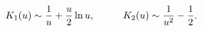 \begin{equation}
\label{rev5}
K_1(u) \sim \frac{1}{u} + \frac{u}{2} \ln u,
\hspace{1.0cm}
K_2(u) \sim \frac{1}{u^2} - \frac{1}{2}.
\end{equation}


